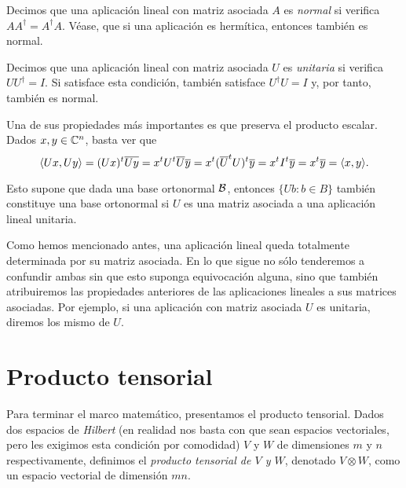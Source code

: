 \begin{definition} Decimos que una aplicación lineal con matriz asociada $A$ es \textit{normal} si verifica $AA^\dag=A^\dag A$. Véase, que si una aplicación es hermítica, entonces también es normal.

Decimos que una aplicación lineal con matriz asociada $U$ es \textit{unitaria} si verifica $UU^\dag=I$. Si satisface esta condición, también satisface $U^\dag U=I$ y, por tanto, también es normal.

Una de sus propiedades más importantes es que preserva el producto escalar. Dados $x,y\in\mathbb{C}^n$, basta ver que
$$\langle Ux,Uy\rangle=(Ux)^t\overline{Uy}=x^t U^t\overline{U}\overline{y}=x^t (\overline{U}^t U)^t\overline{y}=x^t I^t\overline{y}=x^t\overline{y}=\langle x,y\rangle.
$$

Esto supone que dada una base ortonormal $\mathcal{B}$, entonces $\{Ub: b\in B\}$ también constituye una base ortonormal si $U$ es una matriz asociada a una aplicación lineal unitaria.
\end{definition}

Como hemos mencionado antes, una aplicación lineal queda totalmente determinada por su matriz asociada. En lo que sigue no sólo tenderemos a confundir ambas sin que esto suponga equivocación alguna, sino que también atribuiremos las propiedades anteriores de las aplicaciones lineales a sus matrices asociadas. Por ejemplo, si una aplicación con matriz asociada $U$ es unitaria, diremos los mismo de $U$.

\section{Producto tensorial}
\label{sec:sec33}

Para terminar el marco matemático, presentamos el producto tensorial. Dados dos espacios de \textit{Hilbert} (en realidad nos basta con que sean espacios vectoriales, pero les exigimos esta condición por comodidad) $V$ y $W$ de dimensiones $m$ y $n$ respectivamente, definimos  el \textit{producto tensorial de $V$ y $W$}, denotado $V\otimes W$, como un espacio vectorial de dimensión $mn$.

